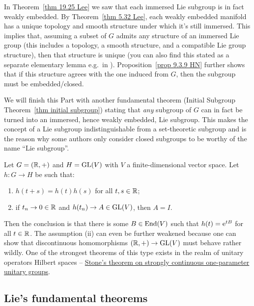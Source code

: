 \begin{rem}\label{rem structure of Lie subgroups}
    In Theorem~\ref{thm 19.25 Lee} we saw that each immersed Lie subgroup is in fact weakly embedded. By Theorem~\ref{thm 5.32 Lee}, each weakly embedded manifold has a unique topology and smooth structure under which it's still immersed. This implies that, assuming a subset of $G$ admits any structure of an immersed Lie group (this includes a topology, a smooth structure, and a compatible Lie group structure), then that structure is unique (you can also find this stated as a separate elementary lemma e.g.~in \cite[Lem.~9.6.12]{HN}). Proposition~\ref{prop 9.3.9 HN} further shows that if this structure agrees with the one induced from $G$, then the subgroup must be embedded/closed. 
    
    We will finish this Part with another fundamental theorem (Initial Subgroup Theorem~\ref{thm initial subgroup}) stating that \emph{any} subgroup of $G$ can in fact be turned into an immersed, hence weakly embedded, Lie subgroup. This makes the concept of a Lie subgroup indistinguishable from a set-theoretic subgroup and is the reason why some authors only consider closed subgroups to be worthy of the name ``Lie subgroup''.
\end{rem}


\begin{example}
    Let $G=(\mathbb{R},+)$ and $H=\operatorname{GL}(V)$ with $V$ a finite-dimensional vector space. Let $h:G\to H$ be such that:
    \begin{enumerate}[label=(\roman*)]
        \item $h(t+s)=h(t)h(s)$ for all $t,s\in\mathbb{R}$;
        \item if $t_n\to 0\in\mathbb{R}$ and $h(t_n)\to A\in\operatorname{GL}(V)$, then $A=I$.
    \end{enumerate}
    Then the conclusion is that there is some $B\in \operatorname{End}(V)$ such that $h(t)=\mathrm{e}^{tB}$ for all $t\in \mathbb{R}$. The assumption (ii) can even be further weakened because one can show that discontinuous homomorphisms $(\mathbb{R},+)\to \operatorname{GL}(V)$ must behave rather wildly. One of the strongest theorems of this type exists in the realm of unitary operators Hilbert spaces -- \href{https://en.wikipedia.org/wiki/Stone%27s_theorem_on_one-parameter_unitary_groups}{Stone's theorem on strongly continuous one-parameter unitary groups}.
\end{example}






\subsection{Lie's fundamental theorems}

